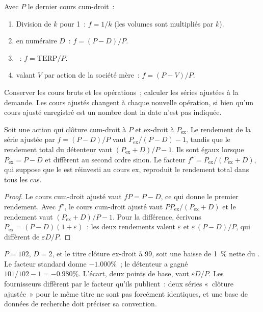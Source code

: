 \begin{method}\label{met:m1:shares-corporate-actions-indices:factors}
Avec $P$ le dernier cours cum-droit~:
\begin{enumerate}
\item Division de $k$ pour 1~: $f = 1/k$ (les volumes sont multipliés par $k$).
\item {} en numéraire $D$~: $f = (P-D)/P$.
\item {}~: $f = \mathrm{TERP}/P$.
\item {} valant $V$ par action de la société mère~: $f = (P-V)/P$.
\end{enumerate}
Conserver les cours bruts et les opérations~; calculer les séries ajustées à la demande.
Les cours ajustés changent à chaque nouvelle opération, si bien qu'un cours ajusté
enregistré est un nombre dont la date n'est pas indiquée.
\end{method}

\begin{proposition}\label{prop:m1:shares-corporate-actions-indices:exact}
Soit une action qui clôture cum-droit à $P$ et ex-droit à $P_{\mathrm{ex}}$. Le rendement de la
série ajustée par $f = (P-D)/P$ vaut $P_{\mathrm{ex}}/(P-D) - 1$, tandis que le
rendement total du détenteur vaut $(P_{\mathrm{ex}}+D)/P - 1$. Ils sont égaux lorsque
$P_{\mathrm{ex}} = P - D$ et diffèrent au second ordre sinon. Le facteur
$f^\star = P_{\mathrm{ex}}/(P_{\mathrm{ex}}+D)$, qui suppose que le  est
réinvesti au cours ex, reproduit le rendement total dans tous les cas.
\end{proposition}
\begin{proof}
Le cours cum-droit ajusté vaut $fP = P - D$, ce qui donne le premier rendement. Avec
$f^\star$, le cours cum-droit ajusté vaut $P P_{\mathrm{ex}}/(P_{\mathrm{ex}}+D)$ et
le rendement vaut $(P_{\mathrm{ex}}+D)/P - 1$. Pour la différence, écrivons
$P_{\mathrm{ex}} = (P-D)(1+\varepsilon)$~: les deux rendements valent $\varepsilon$
et $\varepsilon\,(P-D)/P$, qui diffèrent de $\varepsilon D/P$.
\end{proof}

\begin{example}\label{ex:m1:shares-corporate-actions-indices:approx}
$P = 102$, $D = 2$, et le titre clôture ex-droit à 99, soit une baisse de 1~\% nette du
. Le facteur standard donne $-1.000\%$~; le détenteur a gagné $101/102 -
1 = -0.980\%$. L'écart, deux points de base, vaut $\varepsilon D/P$. Les fournisseurs
diffèrent par le facteur qu'ils publient~: deux séries «~clôture ajustée~» pour le
même titre ne sont pas forcément identiques, et une base de données de recherche doit
préciser sa convention.
\end{example}


